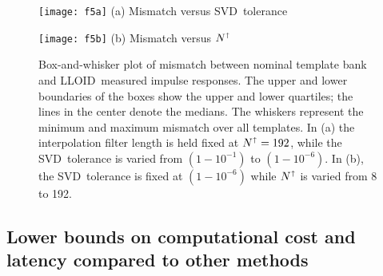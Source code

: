 \documentclass[preprint2]{aastex}
\newcommand{\SVD}{SVD}%
\newcommand{\lloid}{LLOID}%
\begin{document}
\begin{figure*}[b]
	\begin{minipage}[t]{0.5\textwidth}
		\begin{center}
			\texttt{[image: f5a]}
			(a) Mismatch versus \SVD\ tolerance
		\end{center}
	\end{minipage}
	\begin{minipage}[t]{0.5\textwidth}
		\begin{center}
			\texttt{[image: f5b]}
			(b) Mismatch versus $N^\shortuparrow$
		\end{center}
	\end{minipage}
	\caption{\label{fig:bw}Box-and-whisker plot of mismatch between nominal
template bank and \lloid\ measured impulse responses.  The upper and lower boundaries of
the boxes show the upper and lower quartiles; the lines in the center denote the medians.
The whiskers represent the minimum and maximum mismatch over all templates.  In 
(a) the interpolation filter length is held fixed at $N^\shortuparrow = 192$, while
the \SVD\ tolerance is varied from $\left(1-10^{-1}\right)$ to $\left(1-10^{-6}\right)$.
In (b), the \SVD\ tolerance is fixed at $\left(1-10^{-6}\right)$ while $N^\shortuparrow$
is varied from 8 to 192.}
\end{figure*}

\subsection{Lower bounds on computational cost and latency compared to other
methods}
\end{document}
